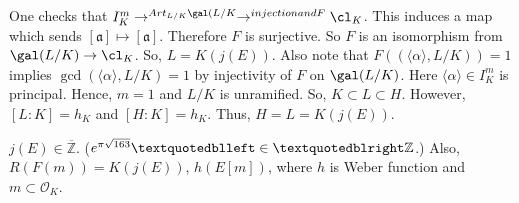 \indent One checks that $I_{K}^{m} \to^{Art_{L/K} \gal(L/K} \to^{injection and F} \cl_{K}$.  This induces a map which sends $[\mathfrak{a}] \mapsto [\mathfrak{a}]$.  Therefore $F$ is surjective.  So $F$ is an isomorphism from $\gal(L/K) \to \cl_{K}$.  So, $L=K(j(E))$.  Also note that $F((\langle \alpha \rangle, L/K))=1$ implies $\gcd(\langle \alpha \rangle,L/K)=1$ by injectivity of $F$ on $\gal(L/K)$.  Here $\langle \alpha \rangle \in I_{K}^{m}$ is principal.  Hence, $m=1$ and $L/K$ is unramified.  So, $K \subset L \subset H$.  However, $[L:K]=h_{K}$ and $[H:K]=h_{K}$.  Thus, $H=L=K(j(E))$.
\begin{theorem}
$j(E) \in \overline{\mathbb{Z}}$.  ($e^{\pi\sqrt{163}} \textquotedblleft\in\textquotedblright\mathbb{Z}$.)  Also, $R(F(m))=K(j(E))$, $h(E[m])$, where $h$ is Weber function and $m \subset \mathscr{O}_{K}$.
\end{theorem}